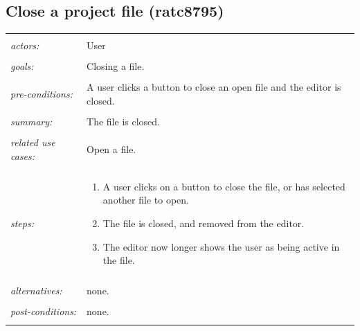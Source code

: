 \documentclass[11pt]{report}
\begin{document}
\begin{IDE-like Features}
\begin{}
\begin{Collaborative features that would be "nice":}
\subsection{Close a project file (ratc8795)}
\begin{tabular}{ p{2cm} p{12cm} }
 \hline
 \\
 \textit{actors:} & User \\ 
 \\
 \textit{goals:} & Closing a file. \\
 \\
 \textit{pre-conditions:} & A user clicks a button to close an open file and the editor is closed. \\
 \\
 \textit{summary:} & The file is closed. \\ 
 \\
 \textit{related use cases:} & Open a file. \\ 
 \\
 \textit{steps:} & \begin{enumerate}
  \item A user clicks on a button to close the file, or has selected another file to open.
  \item The file is closed, and removed from the editor.
  \item The editor now longer shows the user as being active in the file.
 \end{enumerate} \\
 \\
 \textit{alternatives:} & none. \\
 \\
 \textit{post-conditions:} & none. \\
 \\
\hline
\end{tabular}


\end{Collaborative features that would be "nice":}
\end{}
\end{IDE-like Features}
\end{document}
